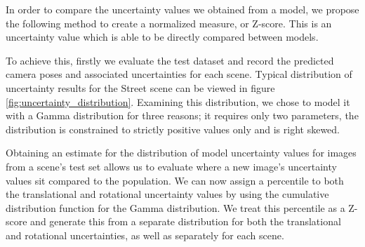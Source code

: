 In order to compare the uncertainty values we obtained from a model, we propose the following method to create a normalized measure, or Z-score. This is an uncertainty value which is able to be directly compared between models.

To achieve this, firstly we evaluate the test dataset and record the predicted camera poses and associated uncertainties for each scene. Typical distribution of uncertainty results for the Street scene can be viewed in figure \ref{fig:uncertainty_distribution}. Examining this distribution, we chose to model it with a Gamma distribution for three reasons; it requires only two parameters, the distribution is constrained to strictly positive values only and is right skewed.

Obtaining an estimate for the distribution of model uncertainty values for images from a scene's test set allows us to evaluate where a new image's uncertainty values sit compared to the population. We can now assign a percentile to both the translational and rotational uncertainty values by using the cumulative distribution function for the Gamma distribution. We treat this percentile as a Z-score and generate this from a separate distribution for both the translational and rotational uncertainties, as well as separately for each scene.

